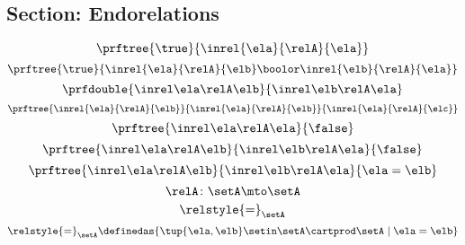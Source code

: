 \begin{forslides}
    \subsection{Section: Endorelations}

    \begin{equation}\label{eq:slides_session2_rel_139}
        \prftree{\true}{\inrel{\ela}{\relA}{\ela}}
    \end{equation}
    \begin{equation}\label{eq:slides_session2_rel_140}
        \prftree{\true}{\inrel{\ela}{\relA}{\elb} \boolor \inrel{\elb}{\relA}{\ela}}
    \end{equation}
    \begin{equation}\label{eq:slides_session2_rel_141}
        \prfdouble{
            \inrel \ela \relA \elb
        }{
            \inrel \elb \relA \ela
        }
    \end{equation}
    \begin{equation}\label{eq:slides_session2_rel_142}
        \prftree{\inrel{\ela}{\relA}{\elb}}{\inrel{\ela}{\relA}{\elb}}{\inrel{\ela}{\relA}{\elc}}
    \end{equation}
    \begin{equation}\label{eq:slides_session2_rel_143}
        \prftree{
            \inrel \ela \relA \ela
        }{
            \false
        }
    \end{equation}
    \begin{equation}\label{eq:slides_session2_rel_144}
        \prftree{
            \inrel \ela \relA \elb
        }{
            \inrel \elb \relA \ela
        }{
            \false
        }
    \end{equation}
    \begin{equation}\label{eq:slides_session2_rel_145}
        \prftree{
            \inrel \ela \relA \elb
        }{
            \inrel \elb \relA \ela
        }{
            \ela = \elb
        }
    \end{equation}
    \begin{equation}\label{eq:slides_session2_rel_146}
        \relA\colon \setA \mto \setA
    \end{equation}
    \begin{equation}\label{eq:slides_session2_rel_147}
        \relstyle{=}_\setA
    \end{equation}
    \begin{equation}\label{eq:slides_session2_rel_148}
        \relstyle{=}_\setA \definedas \{\tup{\ela,\elb}\setin \setA\cartprod \setA \mid \ela=\elb\}

\end{equation}
\end{forslides}

